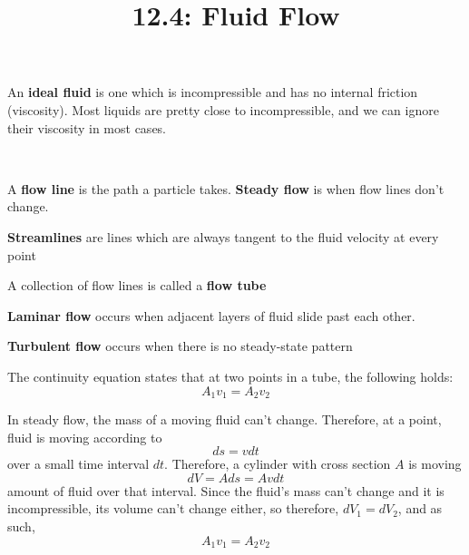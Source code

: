 \documentclass{article}
\title{12.4: Fluid Flow}
\begin{document}
\maketitle

\begin{definition}
An \textbf{ideal fluid} is one which is incompressible and has no internal friction (viscosity). Most liquids are pretty close to incompressible, and we can ignore their viscosity in most cases.  
\end{definition}

\begin{definition}
    \ 

A \textbf{flow line} is the path a particle takes. \textbf{Steady flow} is when flow lines don't change.

\textbf{Streamlines} are lines which are always tangent to the fluid velocity at every point 

A collection of flow lines is called a \textbf{flow tube}

\textbf{Laminar flow} occurs when adjacent layers of fluid slide past each other.

\textbf{Turbulent flow} occurs when there is no steady-state pattern 
\end{definition}

\begin{theorem}
The continuity equation states that at two points in a tube, the following holds: $$A_1v_1 = A_2v_2$$
\end{theorem}

\begin{customproof}
In steady flow, the mass of a moving fluid can't change. Therefore, at a point, fluid is moving according to $$ds = v dt$$over a small time interval $dt$. Therefore, a cylinder with cross section $A$ is moving $$dV = A ds = A v dt$$amount of fluid over that interval. Since the fluid's mass can't change and it is incompressible, its volume can't change either, so therefore, $dV_1 = dV_2$, and as such, $$A_1v_1 = A_2v_2$$ 
\end{customproof}
\end{document}
